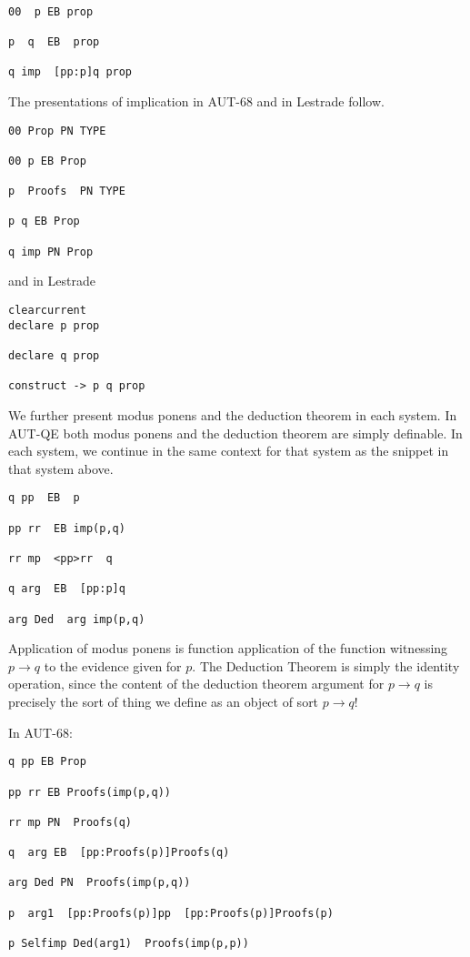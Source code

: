 \documentclass{article}
\begin{document}
   \begin{verbatim}

00  p EB prop

p  q  EB  prop

q imp  [pp:p]q prop

\end{verbatim}

The presentations of implication in AUT-68 and in Lestrade follow.

   \begin{verbatim}
00 Prop PN TYPE

00 p EB Prop

p  Proofs  PN TYPE

p q EB Prop

q imp PN Prop
\end{verbatim}

and in Lestrade

\begin{verbatim}
clearcurrent
declare p prop

declare q prop

construct -> p q prop
\end{verbatim}

We further present modus ponens and the deduction theorem in each system.  In AUT-QE
both modus ponens and the deduction theorem are simply definable.  In each system, we continue
in the same context for that system as the snippet in that system above.

   \begin{verbatim}
q pp  EB  p

pp rr  EB imp(p,q)

rr mp  <pp>rr  q

q arg  EB  [pp:p]q

arg Ded  arg imp(p,q)
\end{verbatim}

Application of modus ponens is function application of the function witnessing $p \rightarrow q$ to the evidence given for $p$.  The Deduction Theorem is simply the identity operation, since the content of the deduction theorem argument for $p \rightarrow q$ is precisely the sort of thing we define as an object of sort $p \rightarrow q$!

In AUT-68:

   \begin{verbatim}
q pp EB Prop

pp rr EB Proofs(imp(p,q))

rr mp PN  Proofs(q)

q  arg EB  [pp:Proofs(p)]Proofs(q)

arg Ded PN  Proofs(imp(p,q))

p  arg1  [pp:Proofs(p)]pp  [pp:Proofs(p)]Proofs(p)

p Selfimp Ded(arg1)  Proofs(imp(p,p))
\end{verbatim}
\end{document}
